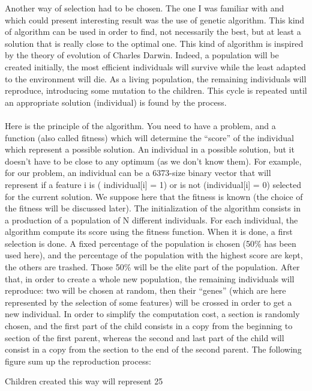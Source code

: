 \documentclass{report}
\begin{document}
		Another way of selection had to be chosen. The one I was familiar with and which could present interesting result was the use of genetic algorithm. This kind of algorithm can be used in order to find, not necessarily the best, but at least a solution that is really close to the optimal one. This kind of algorithm is inspired by the theory of evolution of Charles Darwin. Indeed, a population will be created initially, the most efficient individuals will survive while the least adapted to the environment will die. As a living population, the remaining individuals will reproduce, introducing some mutation to the children. This cycle is repeated until an appropriate solution (individual) is found by the process.\\\\
		Here is the principle of the algorithm. You need to have a problem, and a function (also called fitness) which will determine the “score” of the individual which represent a possible solution. An individual in a possible solution, but it doesn't have to be close to any optimum (as we don't know them). For example, for our problem, an individual can be a 6373-size binary vector that will represent if a feature i is ( individual[i] = 1) or is not (individual[i] = 0) selected for the current solution. We suppose here that the fitness is known (the choice of the fitness will be discussed later).
		The initialization of the algorithm consists in a production of a population of N different individuals. For each individual, the algorithm compute its score using the fitness function. When it is done, a first selection is done. A fixed percentage of the population is chosen (50\% has been used here), and the percentage of the population with the highest score are kept, the others are trashed. Those 50\% will be the elite part of the population. After that, in order to create a whole new population, the remaining individuals will reproduce: two will be chosen at random, then their “genes” (which are here represented by the selection of some features) will be crossed in order to get a new individual. In order to simplify the computation cost, a section is randomly chosen, and the first part of the child consists in a copy from the beginning to section of the first parent, whereas the second and last part of the child will consist in a copy from the section to the end of the second parent. The following figure sum up the reproduction process:
		
		
		Children created this way will represent 25%
		
\end{document}
